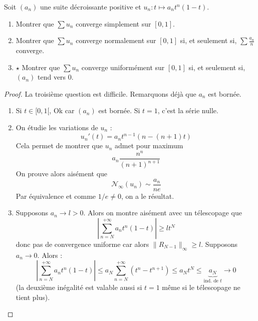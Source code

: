 \documentclass[french,a4paper]{article}
\theoremstyle{plain}
\theoremstyle{definition}
\theoremstyle{remark}
\begin{document}
\begin{ex}{}
	Soit $(a_n)$ une suite décroissante positive et $u_n:t\mapsto a_nt^n(1-t)$.
	\begin{enumerate}
		\item Montrer que $\sum u_n$ converge simplement sur $[0,1]$.
		\item Montrer que $\sum u_n$ converge normalement sur $[0,1]$ si, et seulement si, $\sum\displaystyle\frac{a_n}{n}$ converge.
		\item $\star$ Montrer que $\sum u_n$ converge uniformément sur $[0,1]$ si, et seulement si, $(a_n)$ tend vers $0$.
	\end{enumerate}
\end{ex}
\begin{proof}
	La troisième question est difficile. Remarquons déjà que $a_n$ est bornée.
	\begin{enumerate}
		\item Si $t\in[0,1[$, Ok car $(a_n)$ est bornée. Si $t=1$, c'est la série nulle.
		\item On étudie les variations de $u_n$ : $$u_n'(t)=a_nt^{n-1}(n-(n+1)t)$$ Cela permet de montrer que $u_n$ admet pour maximum $$a_n\frac{n^n}{(n+1)^{n+1}}$$ On prouve alors aisément que $$\mathcal{N}_\infty(u_n)\sim\frac{a_n}{ne}$$ Par équivalence et comme $1/e\ne 0$, on a le résultat.
		\item Supposons $a_n\to l>0$. Alors on montre aisément avec un télescopage que $$\left\lvert\sum_{n=N}^{+\infty}a_nt^n(1-t)\right\rvert\geqslant lt^N$$ donc pas de convergence uniforme car alors $\lVert R_{N-1}\rVert_\infty\geqslant l$. Supposons $a_n\to 0$. Alors : $$\left\lvert\sum_{n=N}^{+\infty}a_nt^n(1-t)\right\rvert\leqslant a_N\sum_{n=N}^{+\infty}(t^n-t^{n+1})\leqslant a_Nt^N\leqslant \underbrace{a_N}_{\text{ind. de }t}\to 0$$ (la deuxième inégalité est valable aussi si $t=1$ même si le télescopage ne tient plus).
	\end{enumerate}
\end{proof}
\end{document}
